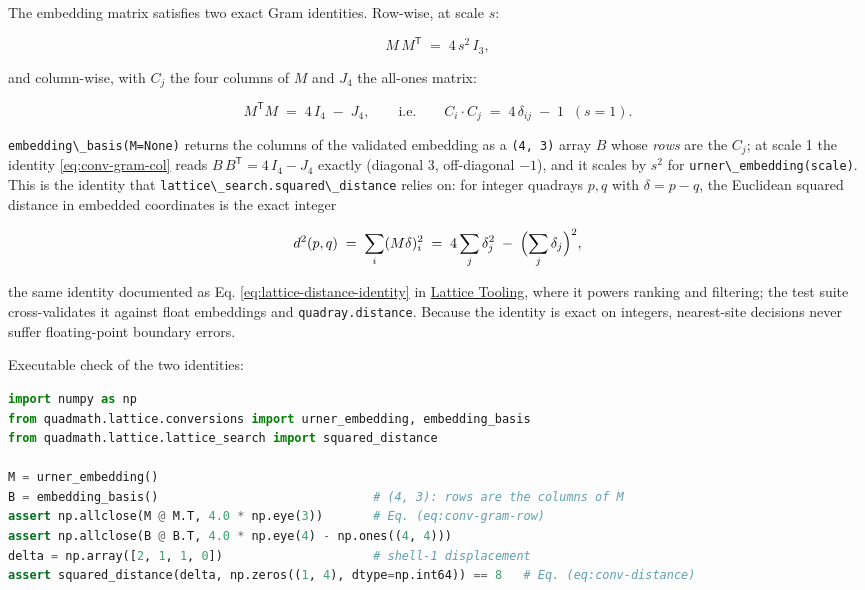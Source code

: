 \documentclass[
  10pt,
]{article}
\newcommand{\passthrough}[1]{#1}
\begin{document}
The embedding matrix satisfies two exact Gram identities. Row-wise, at
scale \(s\):

\begin{equation}
\label{eq:conv-gram-row}
M\,M^{\mathsf{T}} \;=\; 4\,s^{2}\,I_{3},
\end{equation}

and column-wise, with \(C_j\) the four columns of \(M\) and \(J_4\) the
all-ones matrix:

\begin{equation}
\label{eq:conv-gram-col}
M^{\mathsf{T}}M \;=\; 4\,I_{4} \;-\; J_{4},
\qquad \text{i.e.} \qquad
C_i \cdot C_j \;=\; 4\,\delta_{ij} \;-\; 1 \;\; (s = 1).
\end{equation}

\passthrough{\lstinline!embedding\_basis(M=None)!} returns the columns
of the validated embedding as a \passthrough{\lstinline!(4, 3)!} array
\(B\) whose \emph{rows} are the \(C_j\); at scale 1 the identity
\eqref{eq:conv-gram-col} reads \(B\,B^{\mathsf{T}} = 4\,I_4 - J_4\)
exactly (diagonal 3, off-diagonal \(-1\)), and it scales by \(s^2\) for
\passthrough{\lstinline!urner\_embedding(scale)!}. This is the identity
that \passthrough{\lstinline!lattice\_search.squared\_distance!} relies
on: for integer quadrays \(p, q\) with \(\delta = p - q\), the Euclidean
squared distance in embedded coordinates is the exact integer

\begin{equation}
\label{eq:conv-distance}
d^{2}(p, q) \;=\; \sum_{i} (M\delta)_i^{2}
\;=\; 4 \sum_{j} \delta_j^{2} \;-\; \Bigl(\sum_{j} \delta_j\Bigr)^{2},
\end{equation}

the same identity documented as Eq. \eqref{eq:lattice-distance-identity}
in \href{13_lattice_tooling.md}{Lattice Tooling}, where it powers
ranking and filtering; the test suite cross-validates it against float
embeddings and \passthrough{\lstinline!quadray.distance!}. Because the
identity is exact on integers, nearest-site decisions never suffer
floating-point boundary errors.

Executable check of the two identities:

\begin{lstlisting}[language=Python]
import numpy as np
from quadmath.lattice.conversions import urner_embedding, embedding_basis
from quadmath.lattice.lattice_search import squared_distance

M = urner_embedding()
B = embedding_basis()                              # (4, 3): rows are the columns of M
assert np.allclose(M @ M.T, 4.0 * np.eye(3))       # Eq. (eq:conv-gram-row)
assert np.allclose(B @ B.T, 4.0 * np.eye(4) - np.ones((4, 4)))
delta = np.array([2, 1, 1, 0])                     # shell-1 displacement
assert squared_distance(delta, np.zeros((1, 4), dtype=np.int64)) == 8   # Eq. (eq:conv-distance)
\end{lstlisting}
\end{document}

